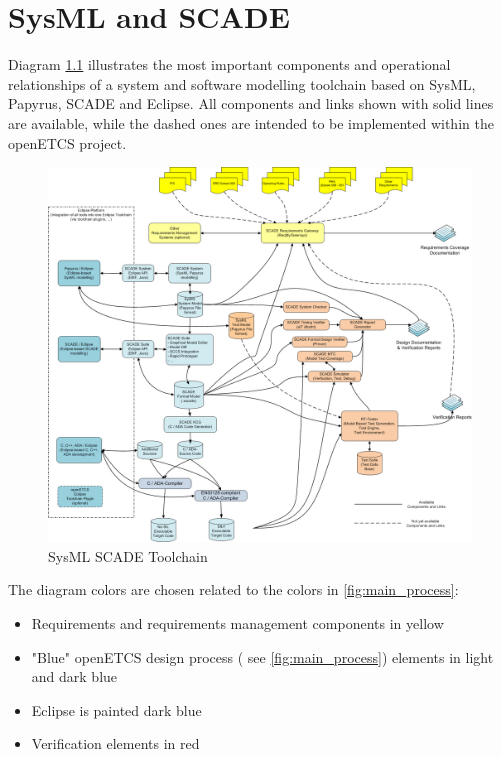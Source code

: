 \chapter{SysML and SCADE}
\label{sec:sysML-Scade}

Diagram \ref{fig:SysML_SCADE_Toolchain} illustrates the most important components and operational relationships of a system and software modelling toolchain based on SysML, Papyrus, SCADE and Eclipse. 
All components and links shown with solid lines are available, while the dashed ones are intended to be implemented within the openETCS project. 


\begin{figure}[htbp]
	\centering
		\includegraphics[width=1.10\textwidth]{images/SysML_SCADE_Toolchain.png}
	\caption{SysML SCADE Toolchain}
	\label{fig:SysML_SCADE_Toolchain}
\end{figure}


The diagram colors are chosen related to the colors in \ref{fig:main_process}: 

\begin{itemize}
	\item Requirements and requirements management components in yellow
	\item "Blue" openETCS design process ( see \ref{fig:main_process}) elements in light and dark blue
	\item Eclipse is painted dark blue
	\item Verification elements in red
\end{itemize}

